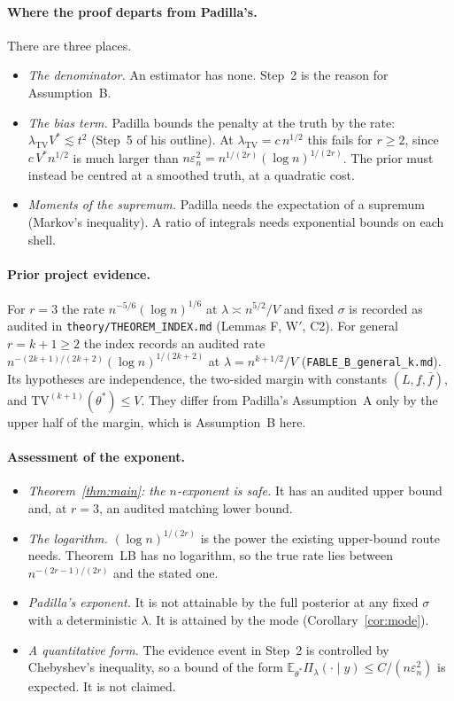 \documentclass[11pt]{article}
\theoremstyle{definition}
\theoremstyle{remark}
\newcommand{\E}{\mathbb{E}}
\newcommand{\TV}{\mathrm{TV}}
\newcommand{\lamtv}{\lambda_{\TV}}
\newcommand{\thetas}{\theta^{*}}
\begin{document}
\paragraph{Where the proof departs from Padilla's.} There are three places.
\begin{itemize}[itemsep=2pt,topsep=2pt]
\item \emph{The denominator.} An estimator has none. Step~2 is the reason for Assumption~B.
\item \emph{The bias term.} Padilla bounds the penalty at the truth by the rate: $\lamtv V^{*}\lesssim t^2$ (Step~5 of his outline). At $\lamtv=c\,n^{1/2}$ this fails for $r\ge2$, since $c\,V^{*}n^{1/2}$ is much larger than $n\varepsilon_n^2=n^{1/(2r)}(\log n)^{1/(2r)}$. The prior must instead be centred at a smoothed truth, at a quadratic cost.
\item \emph{Moments of the supremum.} Padilla needs the expectation of a supremum (Markov's inequality). A ratio of integrals needs exponential bounds on each shell.
\end{itemize}

\paragraph{Prior project evidence.} For $r=3$ the rate $n^{-5/6}(\log n)^{1/6}$ at $\lambda\asymp n^{5/2}/V$ and fixed $\sigma$ is recorded as audited in \texttt{theory/THEOREM\_INDEX.md} (Lemmas F, W$'$, C2). For general $r=k+1\ge2$ the index records an audited rate $n^{-(2k+1)/(2k+2)}(\log n)^{1/(2k+2)}$ at $\lambda=n^{k+1/2}/V$ (\texttt{FABLE\_B\_general\_k.md}). Its hypotheses are independence, the two-sided margin with constants $(L,\underline f,\bar f)$, and $\TV^{(k+1)}(\thetas)\le V$. They differ from Padilla's Assumption~A only by the upper half of the margin, which is Assumption~B here.

\paragraph{Assessment of the exponent.}
\begin{itemize}[itemsep=2pt,topsep=2pt]
\item \emph{Theorem~\ref{thm:main}: the $n$-exponent is safe.} It has an audited upper bound and, at $r=3$, an audited matching lower bound.
\item \emph{The logarithm.} $(\log n)^{1/(2r)}$ is the power the existing upper-bound route needs. Theorem~LB has no logarithm, so the true rate lies between $n^{-(2r-1)/(2r)}$ and the stated one.
\item \emph{Padilla's exponent.} It is not attainable by the full posterior at any fixed $\sigma$ with a deterministic $\lambda$. It is attained by the mode (Corollary~\ref{cor:mode}).
\item \emph{A quantitative form.} The evidence event in Step~2 is controlled by Chebyshev's inequality, so a bound of the form $\E_{\thetas}\Pi_\lambda(\cdot\mid y)\le C/(n\varepsilon_n^2)$ is expected. It is not claimed.
\end{itemize}
\end{document}
